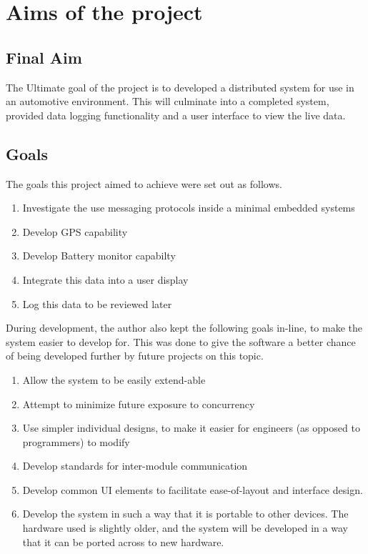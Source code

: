 
\chapter{Aims of the project} %



\section{Final Aim}

The Ultimate goal of the project is to developed a distributed system for use in an automotive environment. This will culminate into a completed system, provided data logging functionality and a user interface to view the live data.

\section{Goals}

The goals this project aimed to achieve were set out as follows.

\begin{enumerate}
\item  Investigate the use messaging protocols inside a minimal embedded systems
\item  Develop GPS capability
\item  Develop Battery monitor capabilty
\item  Integrate this data into a user display
\item  Log this data to be reviewed later
\end{enumerate}

During development, the author also kept the following goals in-line, to make the system easier to develop for.  This was done to give the software a better chance of being developed further by future projects on this topic.


\begin{enumerate}
\item  Allow the system to be easily extend-able
\item  Attempt to minimize future exposure to concurrency
\item  Use simpler individual designs, to make it easier for engineers (as opposed to programmers) to modify
\item Develop standards for inter-module communication
\item Develop common UI elements to facilitate ease-of-layout and interface design.
\item Develop the system in such a way that it is portable to other devices. The hardware used is slightly older, and the system will be developed in a way that it can be ported across to new hardware.
\end{enumerate}



